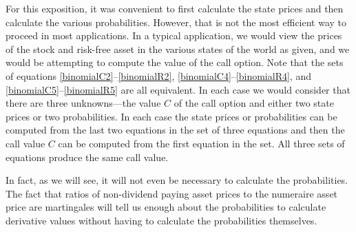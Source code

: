 For this exposition, it was convenient to first calculate the state prices and then calculate the various probabilities.  However, that is not the most efficient way to proceed in most applications.  In a typical application, we would view the prices of the stock and risk-free asset in the various states of the world as given, and we would be attempting to compute the value of the call option.  Note that the sets of equations \eqref{binomialC2}--\eqref{binomialR2}, \eqref{binomialC4}--\eqref{binomialR4}, and \eqref{binomialC5}--\eqref{binomialR5} are all equivalent.  In each case we would consider that there are three unknowns---the value $C$ of the call option and either two state prices or two probabilities.  In each case the state prices or probabilities can be computed from the last two equations in the set of three equations and then the call value $C$ can be computed from the first equation in the set.  All three sets of equations produce the same call value.  

In fact, as we will see, it will not even be necessary to calculate the probabilities.  The fact  that ratios of non-dividend paying asset prices to the numeraire asset price are martingales will tell us enough about the probabilities to calculate derivative values without having to calculate the probabilities themselves.

